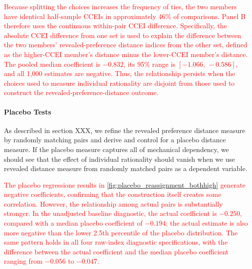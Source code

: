 \documentclass[11 pt]{article}
\begin{document}
\textcolor{red}{Because splitting the choices increases the frequency of ties, the two members have identical half-sample CCEIs in approximately 46\% of comparisons. Panel B therefore uses the continuous within-pair CCEI difference. Specifically, the absolute CCEI difference from one set is used to explain the difference between the two members' revealed-preference distance indices from the other set, defined as the higher-CCEI member's distance minus the lower-CCEI member's distance. The pooled median coefficient is $-0.832$, its 95\% range is $[-1.066,\,-0.586]$, and all 1,000 estimates are negative. Thus, the relationship persists when the choices used to measure individual rationality are disjoint from those used to construct the revealed-preference-distance outcome.}

\paragraph{Placebo Tests} As described in section XXX, we refine the revealed preference distance measure by randomly matching pairs and derive and control for a placebo distance measure. If the placebo measure captures all of mechanical dependency, we should see that the effect of individual rationality should vanish when we use revealed distance measure from randomly matched pairs as a dependent variable. 

\textcolor{red}{The placebo regressions results in \autoref{fig:placebo_reassignment_bothhigh} generate negative coefficients, confirming that the construction itself creates some correlation. However, the relationship among actual pairs is substantially stronger. In the unadjusted baseline diagnostic, the actual coefficient is $-0.250$, compared with a median placebo coefficient of $-0.194$; the actual estimate is also more negative than the lower 2.5th percentile of the placebo distribution. The same pattern holds in all four raw-index diagnostic specifications, with the difference between the actual coefficient and the median placebo coefficient ranging from $-0.056$ to $-0.047$.}
\end{document}
